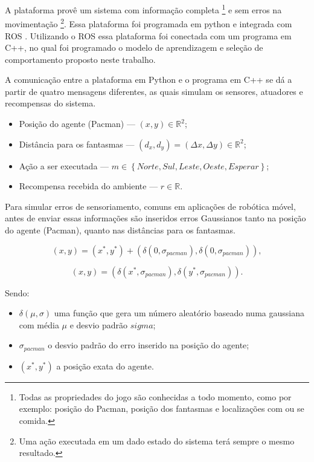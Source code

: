 A plataforma provê um sistema com informação completa%
\footnote{Todas as propriedades do jogo são conhecidas a todo momento, como por exemplo: posição do Pacman, posição dos fantasmas e localizações com ou se comida.%
} e sem erros na movimentação%
\footnote{Uma ação executada em um dado estado do sistema terá sempre o mesmo resultado.%
}. Essa plataforma foi programada em python e integrada com ROS \cite{ROS:1448}. Utilizando o ROS essa plataforma foi conectada com um programa em C++, no qual foi programado o modelo de aprendizagem e seleção de comportamento proposto neste trabalho.

A comunicação entre a plataforma em Python e o programa em C++ se dá a partir de quatro mensagens diferentes, as quais simulam os sensores, atuadores e recompensas do sistema.

\begin{itemize}
	\item Posição do agente (Pacman) --- $ \left( x, y \right) \in \mathbb{R}^2 $;
	\item Distância para os fantasmas --- $ \left( d_x, d_y \right) = \left( \Delta x, \Delta y \right) \in \mathbb{R}^2 $;
	\item Ação a ser executada --- $ m \in \left\{Norte, Sul, Leste, Oeste, Esperar \right\} $;
	\item Recompensa recebida do ambiente --- $ r \in \mathbb{R} $.
\end{itemize}

Para simular erros de sensoriamento, comuns em aplicações de robótica móvel, antes de enviar essas informações são inseridos erros Gaussianos tanto na posição do agente (Pacman), quanto nas distâncias para os fantasmas.

$$
	\left( x, y \right) = \left( x^*, y^* \right) + \left( \delta\left( 0, \sigma_{pacman} \right), \delta\left( 0, \sigma_{pacman} \right) \right),
$$

\begin{equation}
	\left( x, y \right) = \left( \delta\left( x^*, \sigma_{pacman} \right), \delta\left( y^*, \sigma_{pacman} \right) \right).
\end{equation}

Sendo:

\begin{itemize}
	\item $ \delta \left( \mu, \sigma \right) $ uma função que gera um número aleatório baseado numa gaussiana com média $ \mu $ e desvio padrão $ 
sigma $;
	\item $ \sigma_{pacman} $ o desvio padrão do erro inserido na posição do agente;
	\item $ \left( x^*, y^* \right) $ a posição exata do agente.
\end{itemize}

